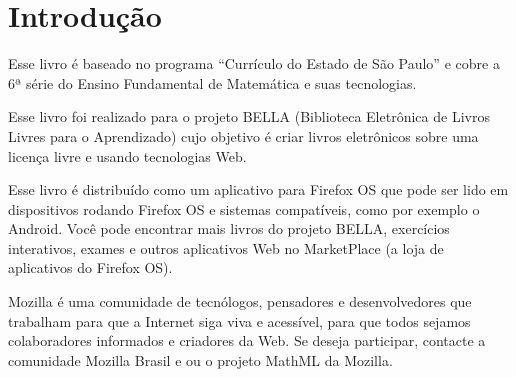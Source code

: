 \section*{Introdução}

Esse livro é baseado no programa ``Currículo do Estado de São Paulo''
e cobre a 6ª série do Ensino Fundamental de Matemática e suas tecnologias.

Esse livro foi realizado para o projeto BELLA
(Biblioteca Eletrônica de Livros Livres para o Aprendizado) cujo objetivo
é criar livros eletrônicos sobre uma licença livre e usando tecnologias Web.

Esse livro é distribuído como um aplicativo para Firefox OS que pode ser lido em
dispositivos rodando Firefox OS e sistemas compatíveis, como por exemplo o
Android. Você pode encontrar mais livros do projeto BELLA, exercícios
interativos, exames e outros aplicativos Web no MarketPlace (a loja de
aplicativos do Firefox OS).

Mozilla é uma comunidade de tecnólogos, pensadores e desenvolvedores que
trabalham para que a Internet siga viva e acessível, para que todos sejamos
colaboradores informados e criadores da Web. Se deseja participar, contacte a
comunidade Mozilla Brasil e ou o projeto MathML da Mozilla.
